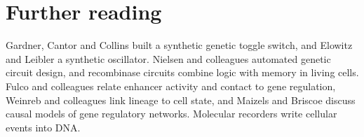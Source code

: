 \section*{Further reading}
Gardner, Cantor and Collins built a synthetic genetic toggle switch,\cite{Gardner2000}
and Elowitz and Leibler a synthetic oscillator.\cite{ElowitzLeibler2000} Nielsen
and colleagues automated genetic circuit design,\cite{Nielsen2016} and recombinase
circuits combine logic with memory in living cells.\cite{Siuti2013,Bonnet2013}
Fulco and colleagues relate enhancer activity and contact to gene
regulation,\cite{Fulco2019} Weinreb and colleagues link lineage to cell
state,\cite{Weinreb2020} and Maizels and Briscoe discuss causal models of gene
regulatory networks.\cite{MaizelsBriscoe2026} Molecular recorders write cellular
events into DNA.\cite{Shipman2017,Choi2022}
